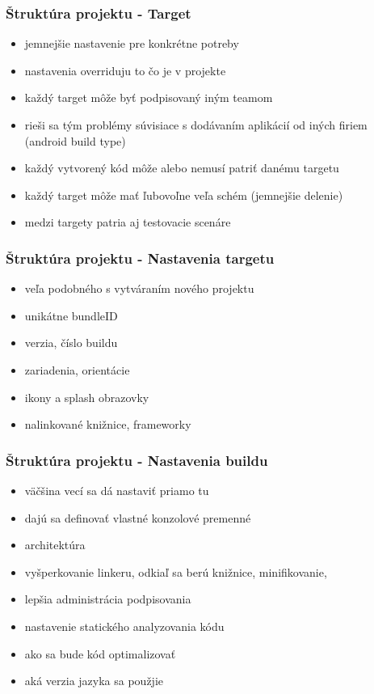 \documentclass[serif,mathserif]{beamer}
\begin{document}
\begin{frame}
  \frametitle{Štruktúra projektu - Target}
  \begin{itemize}
  \item jemnejšie nastavenie pre konkrétne potreby\pause
  \item nastavenia overriduju to čo je v projekte\pause
  \item každý target môže byť podpisovaný iným teamom\pause
  \item rieši sa tým problémy súvisiace s dodávaním aplikácií od iných firiem (android build type)\pause
    \item každý vytvorený kód môže alebo nemusí patriť danému targetu\pause
  \item každý target môže mať ľubovoľne veľa schém (jemnejšie delenie)\pause
  \item medzi targety patria aj testovacie scenáre
  \end{itemize}
\end{frame}

\begin{frame}
  \frametitle{Štruktúra projektu - Nastavenia targetu}
  \begin{itemize}
  \item veľa podobného s vytváraním nového projektu\pause
  \item unikátne bundleID\pause
  \item verzia, číslo buildu\pause
  \item zariadenia, orientácie \pause
  \item ikony a splash obrazovky\pause
  \item nalinkované knižnice, frameworky
  \end{itemize}
\end{frame}

\begin{frame}
  \frametitle{Štruktúra projektu - Nastavenia buildu}
  \begin{itemize}
  \item väčšina vecí sa dá nastaviť priamo tu\pause
  \item dajú sa definovať vlastné konzolové premenné\pause
  \item architektúra \pause
  \item vyšperkovanie linkeru, odkiaľ sa berú knižnice, minifikovanie,  \pause
  \item lepšia administrácia podpisovania \pause
  \item nastavenie statického analyzovania kódu \pause
  \item ako sa bude kód optimalizovať \pause
  \item aká verzia jazyka sa použjie
  \end{itemize}
\end{frame}
\end{document}

